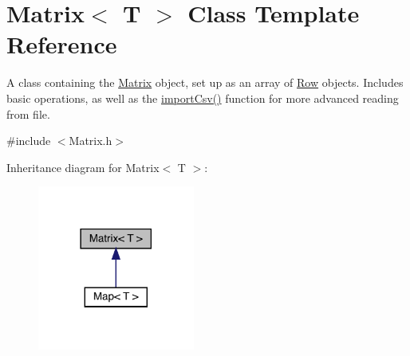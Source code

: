 \hypertarget{class_matrix}{}\section{Matrix$<$ T $>$ Class Template Reference}
\label{class_matrix}


A class containing the \hyperlink{class_matrix}{Matrix} object, set up as an array of \hyperlink{class_row}{Row} objects. Includes basic operations, as well as the \hyperlink{class_matrix_a0a5d9135e9807b81ddc3cf05e777a902}{import\+Csv()} function for more advanced reading from file.  




{\ttfamily \#include $<$Matrix.\+h$>$}



Inheritance diagram for Matrix$<$ T $>$\+:
\nopagebreak
\begin{figure}[H]
\begin{center}
\leavevmode
\includegraphics[width=146pt]{class_matrix__inherit__graph}
\end{center}
\end{figure}
